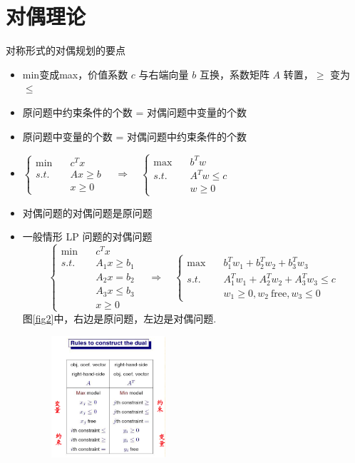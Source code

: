\section{对偶理论}
\begin{remark}
    对称形式的对偶规划的要点
    \begin{itemize}
        \item min变成max，价值系数 $c$ 与右端向量 $b$ 互换，系数矩阵 $A$ 转置，$\ge$ 变为 $\le$
        \item 原问题中约束条件的个数 = 对偶问题中变量的个数
        \item 原问题中变量的个数 = 对偶问题中约束条件的个数
        \item $\begin{cases}
            \min \quad &c^Tx\\
            s.t. \quad &Ax \ge b\\
            & x \ge 0
        \end{cases}\quad  \Longrightarrow \quad \begin{cases}
            \max\quad &b^Tw \\
            s.t.\quad &A^Tw \le c\\
            &w \ge 0
        \end{cases}$
        \item 对偶问题的对偶问题是原问题
        \item 一般情形 LP 问题的对偶问题\[\begin{cases}
            \min \quad & c^Tx\\
            s.t. \quad & A_1x \ge b_1\\
            & A_2x = b_2\\
            &A_3x \le b_3\\
            &x \ge 0
        \end{cases} \quad \Longrightarrow \quad \begin{cases}
            \max \quad & b_1^Tw_1 + b_2^Tw_2 + b_3^Tw_3\\
            s.t. \quad & A_1^Tw_1 + A_2^Tw_2 + A_3^Tw_3 \le c\\
            &w_1 \ge 0, w_2\  \text{free}, w_3 \le 0
        \end{cases}\]
        图\ref{fig2}中，右边是原问题，左边是对偶问题.
        \begin{figure}[htbp]
            \centering
            \includegraphics[width=0.4\textwidth]{./figures/img2.png}

\end{figure}
\end{itemize}
\end{remark}
